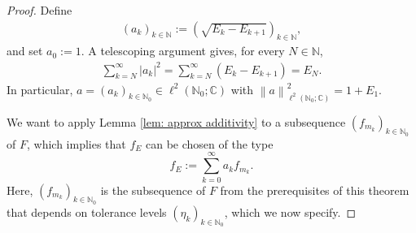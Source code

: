 \documentclass[11pt]{amsart}
\newcommand{\C}{{\mathbb{C}}}
\newcommand{\N}{\mathbb{N}}
\newcommand{\norm}[1]{\ensuremath{\left\lVert\text{}#1\text{}\right\rVert}}
\newenvironment{proof sketch} {\textit{Proof sketch.}}{}
\begin{document}
  \begin{proof}
    Define
    \begin{align*}
      (a_k)_{k \in \N}:=\left(\sqrt{E_k-E_{k+1}}\right)_{k \in \N},
    \end{align*} 
    and set $a_0:=1$. A telescoping argument gives, for every $N \in \N$,
    \begin{align*}
      \sum_{k=N}^\infty |a_k|^2 = \sum_{k=N}^\infty (E_k-E_{k+1}) = E_N.
    \end{align*}
    In particular, $a=(a_k)_{k \in \N_0} \in \ell^2(\N_0;\C)$ with $\norm{a}_{\ell^2(\N_0;\C)}^2=1+E_1$.
    
    We want to apply Lemma \ref{lem: approx additivity} to a subsequence $(f_{m_k})_{k \in \N_0}$ of $F$, which implies that $f_E$ can be chosen of the type 
    \[f_E:=\sum_{k=0}^\infty a_k f_{m_k}.\] 
    Here, $(f_{m_k})_{k \in \N_0}$ is the subsequence of $F$ from the prerequisites of this theorem that depends on tolerance levels $(\eta_k)_{k \in \N_0}$, which we now specify.
  

\end{proof}
\end{document}
